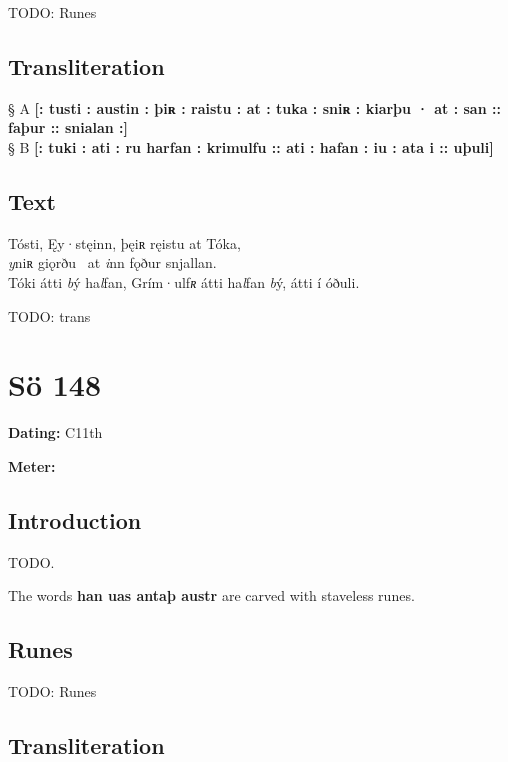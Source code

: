 TODO: Runes%

\subsection{Transliteration}

§ A \textbf{[: tusti : austin : þiʀ : raistu : at : tuka : sniʀ : kiarþu · at : san :: faþur :: snialan :]} \\
§ B \textbf{[: tuki : ati : ru harfan : krimulfu :: ati : hafan : iu : ata i :: uþuli]}

\subsection{Text}

\bpg\bpa[0]%
Tósti, Ęy·stęinn, þęiʀ ręistu at Tóka, \\
\emph{y}niʀ giǫrðu \hld\ at \emph{i}nn fǫður snjallan. \\
Tóki átti \emph{b}ý ha\emph{l}fan, Grím·ulf\emph{ʀ} átti ha\emph{l}fan \emph{b}ý, átti í óðuli.\epa

\bpb TODO: trans\epb\epg

\sectionline\clearpage


\section{Sö 148}

\begin{flushright}%
\textbf{Dating:} C11th

\textbf{Meter:} \Fornyrdislag
\end{flushright}%

\subsection{Introduction}

TODO.

The words \textbf{han uas antaþ austr} are carved with staveless runes.

\subsection{Runes}

TODO: Runes%

\subsection{Transliteration}


